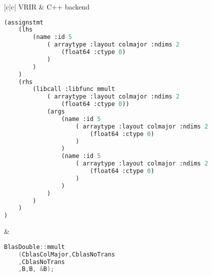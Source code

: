 \begin{table}[htbp]
\begin{tabular}{|c|c|}
\hline 
VRIR & C++ backend \\
\hline 
{
\begin{lstlisting}[language=lisp, frame=none, numbers=none]
(assignstmt
	(lhs
		(name :id 5
   			( arraytype :layout colmajor :ndims 2
				(float64 :ctype 0)
			)
		)
	)
	(rhs
		(libcall :libfunc mmult
			( arraytype :layout colmajor :ndims 2
				(float64 :ctype 0))
			(args
   				(name :id 5
   					( arraytype :layout colmajor :ndims 2
						(float64 :ctype 0)
					)
				)
				(name :id 5
					( arraytype :layout colmajor :ndims 2
						(float64 :ctype 0)
					)
				)
			)
		)
	)
)
\end{lstlisting}
} & 
{
\begin{lstlisting}[language=c,frame=none, numbers=none]
BlasDouble::mmult
	(CblasColMajor,CblasNoTrans
	,CblasNoTrans
	,B,B, &B);
\end{lstlisting}
} \\
\hline
\end{tabular}
\caption[Assignment with Memory optimisation]{Table shows VRIR with array operations on the LHS and the equivalent C++ code that is generated and optimised.}
\label{tab:memAssignment}
\end{table}


